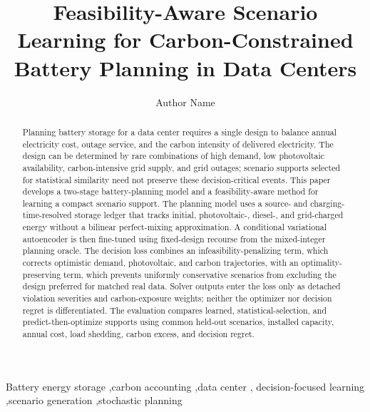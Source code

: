 \documentclass[times]{elsarticle}
\makeatletter
\let\corref\@gobble
\makeatother
\begin{document}
\begin{frontmatter}

\title{Feasibility-Aware Scenario Learning for Carbon-Constrained Battery Planning in Data Centers}

\author[seuaddress]{Author Name\corref{correspondingauthor}}
\address[seuaddress]{School of Electrical Engineering, Southeast University,
Nanjing, China}

\begin{abstract}
Planning battery storage for a data center requires a single design to balance
annual electricity cost, outage service, and the carbon intensity of delivered
electricity. The design can be determined by rare combinations of high demand,
low photovoltaic availability, carbon-intensive grid supply, and grid outages;
scenario supports selected for statistical similarity need not preserve these
decision-critical events. This paper develops a two-stage battery-planning model
and a feasibility-aware method for learning a compact scenario support. The
planning model uses a source- and charging-time-resolved storage ledger that
tracks initial, photovoltaic-, diesel-, and grid-charged energy without a
bilinear perfect-mixing approximation. A conditional variational autoencoder is
then fine-tuned using fixed-design recourse from the mixed-integer planning
oracle. The decision loss combines an infeasibility-penalizing term, which
corrects optimistic demand, photovoltaic, and carbon trajectories, with an
optimality-preserving term, which prevents uniformly conservative scenarios
from excluding the design preferred for matched real data. Solver outputs
enter the loss only as detached violation severities and carbon-exposure
weights; neither the optimizer nor decision regret is differentiated. The
evaluation compares learned, statistical-selection, and predict-then-optimize
supports using common held-out scenarios, installed capacity, annual cost, load
shedding, carbon excess, and decision regret.
\end{abstract}

\begin{keyword}
Battery energy storage \sep carbon accounting \sep data center \sep
decision-focused learning \sep scenario generation \sep stochastic planning
\end{keyword}

\end{frontmatter}
\end{document}
